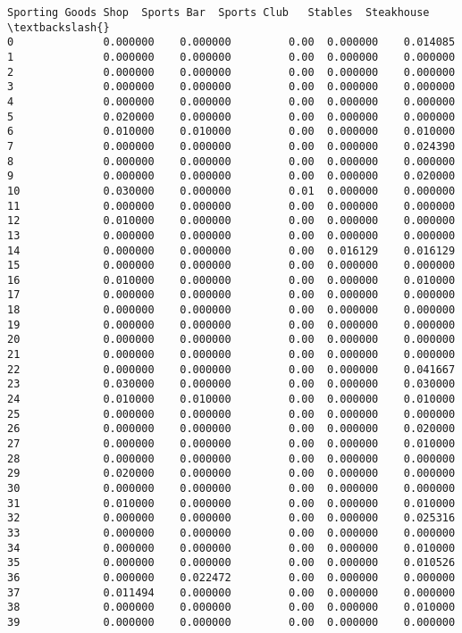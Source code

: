 \documentclass[11pt]{article}
\begin{document}
\begin{tcolorbox}[breakable, size=fbox, boxrule=.5pt, pad at break*=1mm, opacityfill=0]
\begin{Verbatim}[commandchars=\\\{\}]
    Sporting Goods Shop  Sports Bar  Sports Club   Stables  Steakhouse  \textbackslash{}
0              0.000000    0.000000         0.00  0.000000    0.014085
1              0.000000    0.000000         0.00  0.000000    0.000000
2              0.000000    0.000000         0.00  0.000000    0.000000
3              0.000000    0.000000         0.00  0.000000    0.000000
4              0.000000    0.000000         0.00  0.000000    0.000000
5              0.020000    0.000000         0.00  0.000000    0.000000
6              0.010000    0.010000         0.00  0.000000    0.010000
7              0.000000    0.000000         0.00  0.000000    0.024390
8              0.000000    0.000000         0.00  0.000000    0.000000
9              0.000000    0.000000         0.00  0.000000    0.020000
10             0.030000    0.000000         0.01  0.000000    0.000000
11             0.000000    0.000000         0.00  0.000000    0.000000
12             0.010000    0.000000         0.00  0.000000    0.000000
13             0.000000    0.000000         0.00  0.000000    0.000000
14             0.000000    0.000000         0.00  0.016129    0.016129
15             0.000000    0.000000         0.00  0.000000    0.000000
16             0.010000    0.000000         0.00  0.000000    0.010000
17             0.000000    0.000000         0.00  0.000000    0.000000
18             0.000000    0.000000         0.00  0.000000    0.000000
19             0.000000    0.000000         0.00  0.000000    0.000000
20             0.000000    0.000000         0.00  0.000000    0.000000
21             0.000000    0.000000         0.00  0.000000    0.000000
22             0.000000    0.000000         0.00  0.000000    0.041667
23             0.030000    0.000000         0.00  0.000000    0.030000
24             0.010000    0.010000         0.00  0.000000    0.010000
25             0.000000    0.000000         0.00  0.000000    0.000000
26             0.000000    0.000000         0.00  0.000000    0.020000
27             0.000000    0.000000         0.00  0.000000    0.010000
28             0.000000    0.000000         0.00  0.000000    0.000000
29             0.020000    0.000000         0.00  0.000000    0.000000
30             0.000000    0.000000         0.00  0.000000    0.000000
31             0.010000    0.000000         0.00  0.000000    0.010000
32             0.000000    0.000000         0.00  0.000000    0.025316
33             0.000000    0.000000         0.00  0.000000    0.000000
34             0.000000    0.000000         0.00  0.000000    0.010000
35             0.000000    0.000000         0.00  0.000000    0.010526
36             0.000000    0.022472         0.00  0.000000    0.000000
37             0.011494    0.000000         0.00  0.000000    0.000000
38             0.000000    0.000000         0.00  0.000000    0.010000
39             0.000000    0.000000         0.00  0.000000    0.000000


\end{Verbatim}
\end{tcolorbox}
\end{document}
